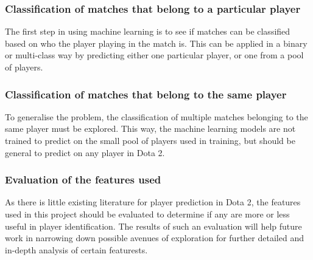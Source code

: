 \documentclass[Report.tex]{subfiles}
\begin{document}
\subsubsection{Classification of matches that belong to a particular player}
The first step in using machine learning is to see if matches can be classified based on who the player playing in the match is. This can be applied in a binary or multi-class way by predicting either one particular player, or one from a pool of players. 

\subsubsection{Classification of matches that belong to the same player}
To generalise the problem, the classification of multiple matches belonging to the same player must be explored. This way, the machine learning models are not trained to predict on the small pool of players used in training, but should be general to predict on any player in Dota 2. 

\subsubsection{Evaluation of the features used}
As there is little existing literature for player prediction in Dota 2, the features used in this project should be evaluated to determine if any are more or less useful in player identification. The results of such an evaluation will help future work in narrowing down possible avenues of exploration for further detailed and in-depth analysis of certain featurests. 





\end{document}
